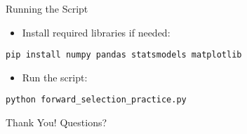 \documentclass[aspectratio=169]{beamer}
\begin{document}
\begin{frame}[fragile]{Running the Script}
  \begin{itemize}
    \item Install required libraries if needed:
  \end{itemize}
  \vspace{0.5cm}
  \begin{verbatim}
pip install numpy pandas statsmodels matplotlib
  \end{verbatim}
  \vspace{0.5cm}
  \begin{itemize}
    \item Run the script:
  \end{itemize}
  \vspace{0.5cm}
  \begin{verbatim}
python forward_selection_practice.py
  \end{verbatim}
\end{frame}

\begin{frame}
  \centering
  \Huge Thank You!
  \vspace{1cm}
  \normalsize Questions?
\end{frame}
\end{document}
